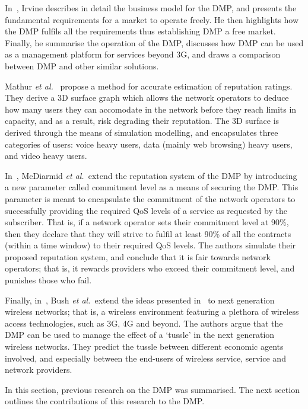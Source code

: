 In~\cite{DMIrvine02}, Irvine describes in detail the business model for the DMP, and presents the fundamental requirements for a market to operate freely. He then highlights how the DMP fulfils all the requirements thus establishing DMP a free market. Finally, he summarise the operation of the DMP, discusses how DMP can be used as a management platform for services beyond 3G, and draws a comparison between DMP and other similar solutions.

Mathur \emph{et al.}~\cite{DMMathur02} propose a method for accurate estimation of reputation ratings. They derive a 3D surface graph which allows the network operators to deduce how many users they can accomodate in the network before they reach limits in capacity, and as a result, risk degrading their reputation. The 3D surface is derived through the means of simulation modelling, and encapsulates three categories of users: voice heavy users, data (mainly web browsing) heavy users, and video heavy users.

In~\cite{DMMcDiarmid06}, McDiarmid \emph{et al.}~extend the reputation system of the DMP by introducing a new parameter called commitment level as a means of securing the DMP. This parameter is meant to encapsulate the commitment of the network operators to successfully providing the required QoS levels of a service as requested by the subscriber. That is, if a network operator sets their commitment level at 90\%, then they declare that they will strive to fulfil at least 90\% of all the contracts (within a time window) to their required QoS levels. The authors simulate their proposed reputation system, and conclude that it is fair towards network operators; that is, it rewards providers who exceed their commitment level, and punishes those who fail.

Finally, in~\cite{DMBushTussle09}, Bush \emph{et al.}~extend the ideas presented in~\cite{DMIrvine02} to next generation wireless networks; that is, a wireless environment featuring a plethora of wireless access technologies, such as 3G, 4G and beyond. The authors argue that the DMP can be used to manage the effect of a `tussle' in the next generation wireless networks. They predict the tussle between different economic agents involved, and especially between the end-users of wireless service, service and network providers.

In this section, previous research on the DMP was summarised. The next section outlines the contributions of this research to the DMP.

